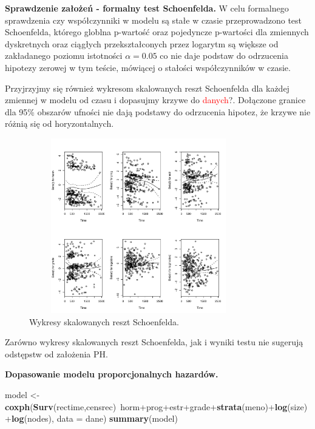 \documentclass[]{article}
\newenvironment{Shaded}{}{}
\newcommand{\KeywordTok}[1]{\textcolor[rgb]{0.00,0.44,0.13}{\textbf{{#1}}}}
\newcommand{\DataTypeTok}[1]{\textcolor[rgb]{0.56,0.13,0.00}{{#1}}}
\newcommand{\StringTok}[1]{\textcolor[rgb]{0.25,0.44,0.63}{{#1}}}
\newcommand{\NormalTok}[1]{{#1}}
\begin{document}
\textbf{Sprawdzenie założeń - formalny test Schoenfelda.} \newline
W celu formalnego sprawdzenia czy współczynniki w modelu są stałe w
czasie przeprowadzono test Schoenfelda, którego globlna p-wartość oraz
pojedyncze p-wartości dla zmiennych dyskretnych oraz ciągłych
przekształconych przez logarytm są większe od zakładanego poziomu
istotności \(\alpha=0.05\) co nie daje podstaw do odrzucenia hipotezy
zerowej w tym teście, mówiącej o stałości współczynników w czasie.

Przyjrzyjmy się również wykresom skalowanych reszt Schoenfelda dla
każdej zmiennej w modelu od czasu i dopasujmy krzywe do
\textcolor{red}{danych}?. Dołączone granice dla 95\% obszarów ufności
nie dają podstawy do odrzucenia hipotez, że krzywe nie różnią się od
horyzontalnych.

\begin{figure}[hbt!]
\vspace{-10pt}
  \begin{center}
      \includegraphics[width=0.85\textwidth, height=3in]{skal_res_shen.pdf}
      \caption{Wykresy skalowanych reszt Schoenfelda.}
   \end{center}
\end{figure}

Zarówno wykresy skalowanych reszt Schoenfelda, jak i wyniki testu nie
sugerują odstępstw od założenia PH.

\textbf{Dopasowanie modelu proporcjonalnych hazardów.} \newline

\begin{Shaded}
\begin{Highlighting}[]
\NormalTok{model <-}\StringTok{ }\KeywordTok{coxph}\NormalTok{(}\KeywordTok{Surv}\NormalTok{(rectime,censrec)~horm+prog+estr+grade+}\KeywordTok{strata}\NormalTok{(meno)+}\KeywordTok{log}\NormalTok{(size)+}\KeywordTok{log}\NormalTok{(nodes), }
               \DataTypeTok{data =} \NormalTok{dane) }
\KeywordTok{summary}\NormalTok{(model)}
\end{Highlighting}
\end{Shaded}
\end{document}

